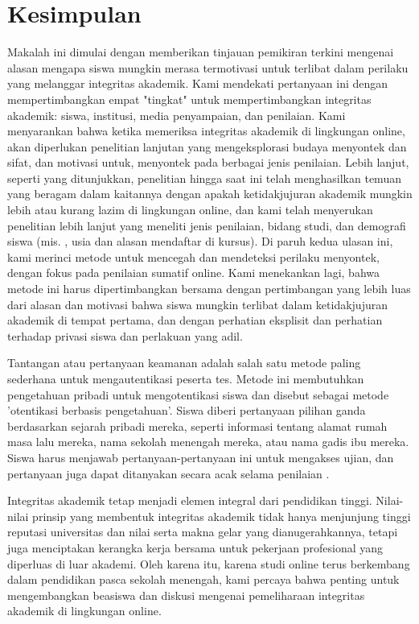 \section{Kesimpulan}
\label{sec:kesimpulan}


Makalah ini dimulai dengan memberikan tinjauan pemikiran terkini mengenai alasan mengapa siswa mungkin merasa termotivasi untuk terlibat dalam perilaku yang melanggar integritas akademik. Kami mendekati pertanyaan ini dengan mempertimbangkan empat "tingkat" untuk mempertimbangkan integritas akademik: siswa, institusi, media penyampaian, dan penilaian. Kami menyarankan bahwa ketika memeriksa integritas akademik di lingkungan online, akan diperlukan penelitian lanjutan yang mengeksplorasi budaya menyontek dan sifat, dan motivasi untuk, menyontek pada berbagai jenis penilaian. Lebih lanjut, seperti yang ditunjukkan, penelitian hingga saat ini telah menghasilkan temuan yang beragam dalam kaitannya dengan apakah ketidakjujuran akademik mungkin lebih atau kurang lazim di lingkungan online, dan kami telah menyerukan penelitian lebih lanjut yang meneliti jenis penilaian, bidang studi, dan demografi siswa (mis. , usia dan alasan mendaftar di kursus). Di paruh kedua ulasan ini, kami merinci metode untuk mencegah dan mendeteksi perilaku menyontek, dengan fokus pada penilaian sumatif online. Kami menekankan lagi, bahwa metode ini harus dipertimbangkan bersama dengan pertimbangan yang lebih luas dari alasan dan motivasi bahwa siswa mungkin terlibat dalam ketidakjujuran akademik di tempat pertama, dan dengan perhatian eksplisit dan perhatian terhadap privasi siswa dan perlakuan yang adil.

Tantangan atau pertanyaan keamanan adalah salah satu metode paling sederhana untuk mengautentikasi peserta tes. Metode ini membutuhkan pengetahuan pribadi untuk mengotentikasi siswa dan disebut sebagai metode 'otentikasi berbasis pengetahuan'. Siswa diberi pertanyaan pilihan ganda berdasarkan sejarah pribadi mereka, seperti informasi tentang alamat rumah masa lalu mereka, nama sekolah menengah mereka, atau nama gadis ibu mereka. Siswa harus menjawab pertanyaan-pertanyaan ini untuk mengakses ujian, dan pertanyaan juga dapat ditanyakan secara acak selama penilaian .

Integritas akademik tetap menjadi elemen integral dari pendidikan tinggi. Nilai-nilai prinsip yang membentuk integritas akademik tidak hanya menjunjung tinggi reputasi universitas dan nilai serta makna gelar yang dianugerahkannya, tetapi juga menciptakan kerangka kerja bersama untuk pekerjaan profesional yang diperluas di luar akademi. Oleh karena itu, karena studi online terus berkembang dalam pendidikan pasca sekolah menengah, kami percaya bahwa penting untuk mengembangkan beasiswa dan diskusi mengenai pemeliharaan integritas akademik di lingkungan online.
